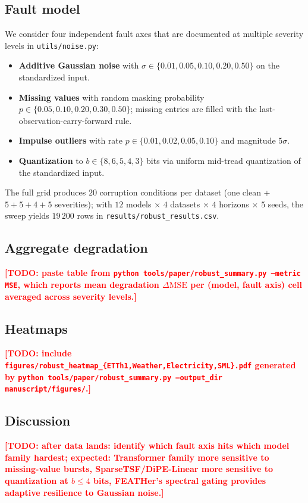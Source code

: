 \documentclass[journal]{IEEEtran}
\theoremstyle{remark}
\newcommand{\TODO}[1]{\textcolor{red}{\textbf{[TODO: #1]}}}
\begin{document}
\subsection{Fault model}
\label{subsec:robust-faults}
We consider four independent fault axes that are documented at
multiple severity levels in \texttt{utils/noise.py}:
\begin{itemize}
\item \textbf{Additive Gaussian noise} with
       $\sigma \in \{0.01, 0.05, 0.10, 0.20, 0.50\}$ on
       the standardized input.
\item \textbf{Missing values} with random masking probability
       $p \in \{0.05, 0.10, 0.20, 0.30, 0.50\}$; missing entries
       are filled with the last-observation-carry-forward rule.
\item \textbf{Impulse outliers} with rate
       $p \in \{0.01, 0.02, 0.05, 0.10\}$ and magnitude $5\sigma$.
\item \textbf{Quantization} to
       $b \in \{8, 6, 5, 4, 3\}$ bits via uniform mid-tread
       quantization of the standardized input.
\end{itemize}
The full grid produces $20$ corruption conditions per dataset
(one clean + $5{+}5{+}4{+}5$ severities); with $12$ models
$\times$ $4$ datasets $\times$ $4$ horizons $\times$ $5$ seeds, the
sweep yields $19\,200$ rows in
\texttt{results/robust\_results.csv}.

\subsection{Aggregate degradation}
\label{subsec:robust-summary}
\TODO{paste table from \texttt{python tools/paper/robust\_summary.py --metric MSE}, which reports mean degradation $\Delta\mathrm{MSE}$ per (model, fault axis) cell averaged across severity levels.}

\subsection{Heatmaps}
\label{subsec:robust-heatmaps}
\TODO{include \texttt{figures/robust\_heatmap\_\{ETTh1,Weather,Electricity,SML\}.pdf} generated by \texttt{python tools/paper/robust\_summary.py --output\_dir manuscript/figures/}.}

\subsection{Discussion}
\TODO{after data lands: identify which fault axis hits which model
family hardest; expected: Transformer family more sensitive to
missing-value bursts, SparseTSF/DiPE-Linear more sensitive to
quantization at $b{\le}4$ bits, FEATHer's spectral gating provides
adaptive resilience to Gaussian noise.}
\end{document}
